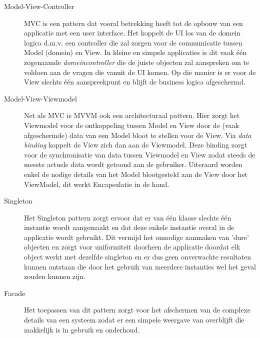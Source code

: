 \begin{description}
  \item [Model-View-Controller] MVC is een pattern dat vooral betrekking heeft tot de opbouw van een applicatie met een user interface. Het koppelt de UI los van de domein logica d.m.v. een controller die zal zorgen voor de communicatie tussen Model (domein) en View. In kleine en simpele applicaties is dit vaak één zogenaamde \textit{domeincontroller} die de juiste objecten zal aanspreken om te voldoen aan de vragen die vanuit de UI komen. Op die manier is er voor de View slechts één aanspreekpunt en blijft de business logica afgeschermd.
  \item [Model-View-Viewmodel] Net als MVC is MVVM ook een architecturaal pattern. Hier zorgt het Viewmodel voor de ontkoppeling tussen Model en View door de (vaak afgeschermde) data van een Model bloot te stellen voor de View. Via \textit{data binding} koppelt de View zich dan aan de Viewmodel. Deze binding zorgt voor de synchronisatie van data tussen Viewmodel en View zodat steeds de meeste actuele data wordt getoond aan de gebruiker. Uiteraard worden enkel de nodige details van het Model blootgesteld aan de View door het ViewModel, dit werkt Encapsulatie in de hand.
  \item [Singleton] Het Singleton pattern zorgt ervoor dat er van één klasse slechts één instantie wordt aangemaakt en dat deze enkele instantie overal in de applicatie wordt gebruikt. Dit vermijd het onnodige aanmaken van 'dure' objecten en zorgt voor uniformiteit doorheen de applicatie doordat elk object werkt met dezelfde singleton en er dus geen onverwachte resultaten kunnen ontstaan die door het gebruik van meerdere instanties wel het geval zouden kunnen zijn.
  \item [Facade] Het toepassen van dit pattern zorgt voor het afschermen van de complexe details van een systeem zodat er een simpele weergave van overblijft die makkelijk is in gebruik en onderhoud.
\end{description}

